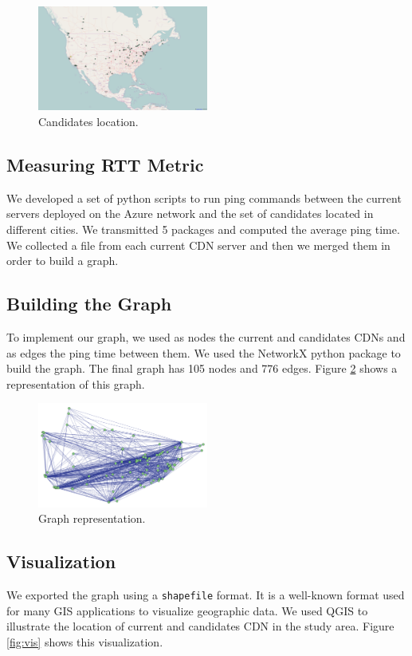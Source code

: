 \documentclass[11pt,twocolumn]{article}
\begin{document}
\begin{figure}
  \centering
  \includegraphics[width=0.5\textwidth]{candidates.png}
  \caption{Candidates location.}\label{fig:candidates}
\end{figure}

\subsection{Measuring RTT Metric}
We developed a set of python scripts to run ping commands between the current servers deployed on the Azure network and the set of candidates located in different cities.  We transmitted 5 packages and computed the average ping time.  We collected a file from each current CDN server and then we merged them in order to build a graph.  

\subsection{Building the Graph}
To implement our graph, we used as nodes the current and candidates CDNs and as edges the ping time between them. We used the NetworkX python package to build the graph.  The final graph has 105 nodes and 776 edges.  Figure \ref{fig:graph} shows a representation of this graph.

\begin{figure}
  \centering
  \includegraphics[width=0.5\textwidth]{graph.png}
  \caption{Graph representation.}\label{fig:graph}
\end{figure}

\subsection{Visualization}
We exported the graph using a \texttt{shapefile} format.  It is a well-known format used for many GIS applications to visualize geographic data.  We used QGIS \cite{qgis} to illustrate the location of current and candidates CDN in the study area.  Figure \ref{fig:vis} shows this visualization.
\end{document}

